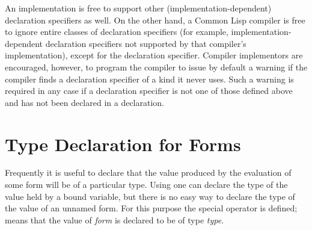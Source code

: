 An implementation is free to support other (implementation-dependent)
declaration specifiers as well.
On the other hand, a Common Lisp compiler is free to
ignore entire classes of declaration specifiers (for example,
implementation-dependent declaration specifiers
not supported by that compiler's
implementation), except for the  declaration specifier.
Compiler implementors are encouraged, however, to
program the compiler to issue by default a warning if the compiler finds
a declaration specifier of a kind it never uses.  Such a warning is required
in any case
if a declaration specifier is not one of those defined above and has not been
declared in a  declaration.

\section{Type Declaration for Forms}

Frequently it is useful to declare that the value produced
by the evaluation of some form will be of a particular type.
Using  one can declare the type of the value
held by a bound variable, but there is no easy way to declare
the type of the value of an unnamed form.  For this purpose the 
special operator is defined;  means
that the value of \emph{form} is declared to be of type \emph{type}.

